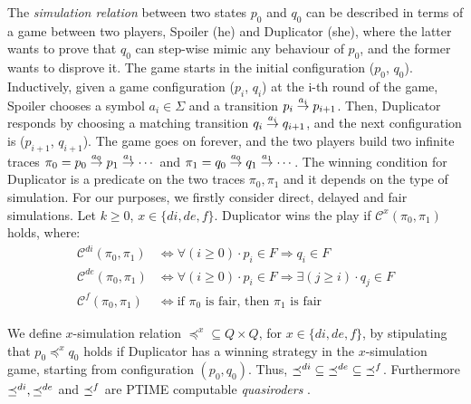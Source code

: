 The \emph{simulation relation} between two states $p_0$ and $q_0$ can be
described in terms of a game between two players, Spoiler (he) and Duplicator (she),
where the latter wants to prove that $q_0$ can step-wise mimic any behaviour of $p_0$,
and the former wants to disprove it.
The game starts in the initial configuration ($p_0$, $q_0$).
Inductively, given a game configuration ($p_i$, $q_i$) at the i-th round of the game,
Spoiler chooses a symbol $a_i \in \Sigma$ and a transition $p_i \overset{a_i}{\rightarrow} p_{i+1}$.
Then, Duplicator responds by choosing a matching transition $q_i \overset{a_i}{\rightarrow} q_{i+1}$,
and the next configuration is ($p_{i+1}$, $q_{i+1}$).
The game goes on forever, and the two players build two
infinite traces $\pi_0 = p_0 \overset{a_0}{\rightarrow} p_1 \overset{a_1}{\rightarrow} \cdots$
and $\pi_1 = q_0 \overset{a_0}{\rightarrow} q_1 \overset{a_1}{\rightarrow} \cdots$.
The winning condition for Duplicator is a predicate on the two traces $\pi_0, \pi_1$
and it depends on the type of simulation.
For our purposes, we firstly consider direct\cite{dill1991checking},
delayed\cite{etessami2005fair} and fair\cite{henzinger1995computing} simulations.
Let $k \geq 0$, $x \in \{di, de, f\}$.
Duplicator wins the play if $\mathcal{C}^x (\pi_0,\pi_1)$ holds, where:
\begin{equation*} \label{eq1}
\begin{split}
\mathcal{C}^{di}(\pi_0,\pi_1) & \Longleftrightarrow
\forall (i \geq 0) \cdot p_i \in F \Longrightarrow q_i \in F \\
\mathcal{C}^{de}(\pi_0,\pi_1)  & \Longleftrightarrow
\forall (i \geq 0) \cdot p_i \in F \Longrightarrow \exists (j \geq i) \cdot q_j \in F \\
\mathcal{C}^{f}(\pi_0,\pi_1) & \Longleftrightarrow
\textrm{if } \pi_0 \textrm{ is fair, then } \pi_1 \textrm{ is fair}
\end{split}
\end{equation*}

We define $x$-simulation relation $\mathord{\preceq^{x}} \subseteq Q \times Q$,
for $x \in \{di, de, f\}$, by stipulating that $p_0 \preceq^x q_0$
holds if Duplicator has a winning strategy in the $x$-simulation game,
starting from configuration $(p_0,q_0)$.
Thus, $\mathord{\preceq^{di}} \subseteq \mathord{\preceq^{de}} \subseteq \mathord{\preceq^{f}}$.
Furthermore $\preceq^{di}, \preceq^{de}$ and $\preceq^{f}$ are PTIME computable \emph{quasiroders}
\cite{dill1991checking, etessami2005fair, henzinger1995computing, henzinger2002fair}.


